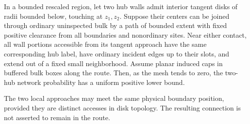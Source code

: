 \begin{lemma}
\label{disk:auxiliary-contact}
In a bounded rescaled region, let two hub walls admit interior
tangent disks of radii bounded below, touching at \(z_1,z_2\).
Suppose their centers can be joined through ordinary uninspected
bulk by a path of bounded extent with fixed positive clearance
from all boundaries and nonordinary sites.  Near either contact,
all wall portions accessible from its tangent approach have the
same corresponding hub label, have ordinary incident edges up
to their slots, and extend out of a fixed small neighborhood.
Assume planar induced caps in buffered bulk boxes along the route.
Then, as the mesh tends to zero, the two-hub network probability
has a uniform positive lower bound.

The two local approaches may meet the same physical boundary
position, provided they are distinct accesses in disk topology.
The resulting connection is not asserted to remain in the route.
\end{lemma}

